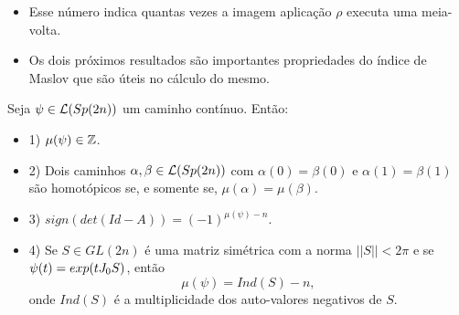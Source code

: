 \documentclass{beamer}
\begin{document}
\begin{frame}
	\begin{itemize}
		\item 
		Esse número indica quantas vezes a imagem aplicação $\rho$ executa uma meia-volta.
		
		\item  Os dois próximos resultados são importantes propriedades do índice de Maslov que são úteis no cálculo do mesmo.
	\end{itemize}
	
	\begin{teorema}
		Seja $\psi\in \mathcal{L}(Sp(2n)) $ um caminho contínuo. Então:
	\end{teorema}
	\begin{itemize}
		
		\item 1) $\mu(\psi) \in \mathbb{Z}$.
		\item 2) Dois caminhos $\alpha, \beta \in \mathcal{L}(Sp(2n)) $ com $\alpha(0) = \beta(0)$ e $\alpha(1) = \beta(1)$ são homotópicos se, e somente se, $\mu(\alpha) = \mu(\beta)$.
		\item 3) $sign(det(Id - A)) = (-1)^{\mu(\psi)-n}$.
		\item 4) Se $S \in GL(2n)$ é uma matriz simétrica com a norma $||S|| < 2\pi$ e se $\psi(t) = exp(tJ_{0} S)$, então 
		$$
		\mu(\psi) = Ind(S) - n,
		$$
		onde $Ind(S)$ é a multiplicidade dos auto-valores negativos de $S$.
	\end{itemize}
\end{frame}
\end{document}
